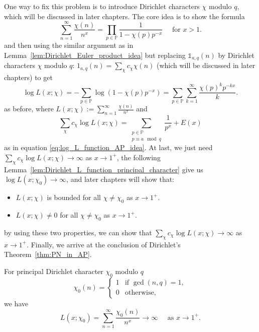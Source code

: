 \documentclass{elegantbook}
\begin{document}
\begin{note}
  One way to fix this problem is to introduce Dirichlet characters $\chi$ modulo $q$, which will be discussed in later chapters. The core idea is to show the formula
  \[
    \sum_{n=1}^{\infty} \frac{\chi(n)}{n^x} = \prod_{p\in \mathbb{P}} \frac{1}{1 - \chi(p) p^{-x}} \quad \text{ for } x > 1.
  \]
  and then using the similar argument as in Lemma~\ref{lem:Dirichlet_Euler_product_idea} but replacing $\mathds{1}_{a,q}(n)$ by Dirichlet characters $\chi$ modulo $q$: $1_{a,q}(n)=\sum_{\chi} c_{\chi} \chi(n)$ (which will be discussed in later chapters) to get
  \[
    \log L(x;\chi) = -\sum_{p \in \mathbb{P}} \log(1 - \chi(p) p^{-x}) = \sum_{p \in \mathbb{P}} \sum_{k=1}^{\infty} \frac{\chi(p)^k p^{-kx}}{k}.
  \]
  as before, where $L(x;\chi):= \sum_{n=1}^{\infty} \frac{\chi(n)}{n^x}$ and
  \[
    \sum_{\chi} c_{\chi} \log L(x;\chi) = \sum_{\substack{p \in \mathbb{P} \\ p \equiv a \mod q}} \frac{1}{p^x} + E(x)
  \]
  as in equation \eqref{eq:log_L_function_AP_idea}. At last, we just need $\sum_{\chi} c_{\chi} \log L(x;\chi) \to \infty$ as $x \to 1^+$, the following Lemma~\ref{lem:Dirichlet_L_function_principal_character} give us $\log L(x;\chi_0) \to \infty$, and later chapters will show that:
  \begin{itemize}
    \item $L(x;\chi)$ is bounded for all $\chi \ne \chi_0$ as $x \to 1^+$.
    \item $L(x;\chi)\ne0$ for all $\chi\ne \chi_0$ as $x \to 1^+$.
  \end{itemize}
  by using these two properties, we can show that $\sum_{\chi} c_{\chi} \log L(x;\chi) \to \infty$ as $x \to 1^+$. Finally, we arrive at the conclusion of Dirichlet's Theorem~\ref{thm:PN_in_AP}.
\end{note}

\begin{lemma} \label{lem:Dirichlet_L_function_principal_character}
  For principal Dirichlet character $\chi_0$ modulo $q$
  \[
    \chi_0(n) = \begin{cases} 1 & \text{if } \gcd(n, q) = 1, \\ 0 & \text{otherwise}, \end{cases}
  \]
  we have
  \[
    L(x;\chi_0) = \sum_{n=1}^{\infty} \frac{\chi_0(n)}{n^x} \to \infty \quad \text{ as } x \to 1^+.
  \]
\end{lemma}
\end{document}
